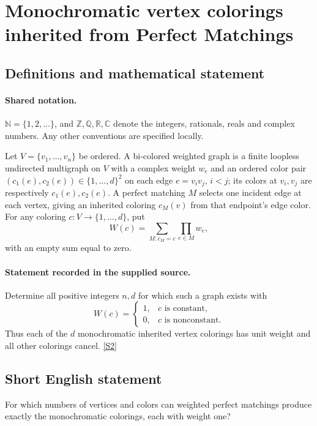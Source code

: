 \documentclass[11pt]{article}
\newcommand{\sref}[2]{\hyperlink{source:#1:#2}{[S#2]}}
\begin{document}
\section{Monochromatic vertex colorings inherited from Perfect Matchings}\label{statement}

\subsection{Definitions and mathematical statement}

\paragraph{Shared notation.}$\mathbb N=\{1,2,\ldots\}$, and $\mathbb Z,\mathbb Q,\mathbb R,\mathbb C$ denote the integers, rationals, reals and complex numbers. Any other conventions are specified locally.


Let $V=\{v_1,\ldots,v_n\}$ be ordered. A bi-colored weighted graph is a finite loopless undirected multigraph on $V$ with a complex weight $w_e$ and an ordered color pair $(c_1(e),c_2(e))\in\{1,\ldots,d\}^2$ on each edge $e=v_iv_j$, $i<j$; its colors at $v_i,v_j$ are respectively $c_1(e),c_2(e)$. A perfect matching $M$ selects one incident edge at each vertex, giving an inherited coloring $c_M(v)$ from that endpoint's edge color. For any coloring $c:V\to\{1,\ldots,d\}$, put \[W(c)=\sum_{M:c_M=c}\prod_{e\in M}w_e,\] with an empty sum equal to zero.
\paragraph{Statement recorded in the supplied source.}
Determine all positive integers $n,d$ for which such a graph exists with \[W(c)=\begin{cases}1,&c\text{ is constant},\\0,&c\text{ is nonconstant}.\end{cases}\] Thus each of the $d$ monochromatic inherited vertex colorings has unit weight and all other colorings cancel. \sref{statement}{2}
\subsection{Short English statement}
For which numbers of vertices and colors can weighted perfect matchings produce exactly the monochromatic colorings, each with weight one?
\end{document}
